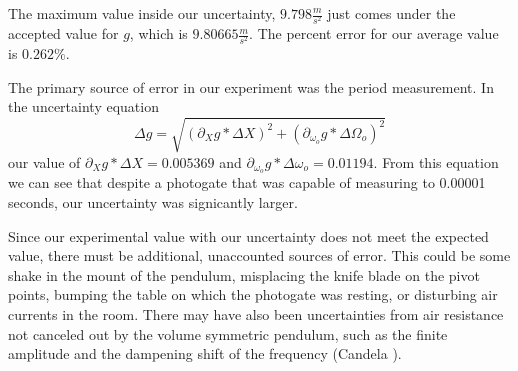 The maximum value inside our uncertainty, $9.798 \frac{m}{s^2}$ just comes under the accepted value for $g$, which is $9.80665 \frac{m}{s^2}$. The percent error for our average value is $0.262\%$.

The primary source of error in our experiment was the period measurement. In the uncertainty equation 
\begin{equation}
\Delta g = \sqrt{(\partial_{X}g *\Delta X)^2 + (\partial_{\omega_o}g*\Delta\Omega_o)^2}
\end{equation}
our value of $\partial_{X}g *\Delta X=0.005369$ and $\partial_{\omega_o}g*\Delta\omega_o = 0.01194$. From this equation we can see that despite a photogate that was capable of measuring to 0.00001 seconds, our uncertainty was signicantly larger. 

Since our experimental value with our uncertainty does not meet the  expected value, there must be additional, unaccounted sources of error. This could be some shake in the mount of the pendulum, misplacing the knife blade on the pivot points, bumping the table on which the photogate was resting, or disturbing air currents in the room. There may have also been uncertainties from air resistance not canceled out by the volume symmetric pendulum, such as the finite amplitude and the dampening shift of the frequency (Candela \cite{Candela2001}).
%
